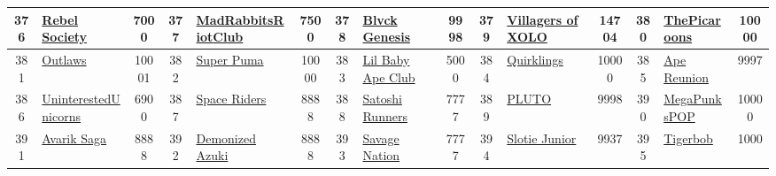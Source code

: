 \begin{table*}[]
{\begin{tabular}{|c|l|c|c|l|c|c|l|c|c|l|c|c|l|c|}
        376   & \href{https://www.rebelsociety.io/}{Rebel Society}                                 & 7000              & 377   & \href{https://madrabbits.io/}{MadRabbitsRiotClub}                                                 & 7500              & 378   & \href{https://blvck.com}{Blvck Genesis}                                           & 9998              & 379   & \href{https://planetxolo.com/}{Villagers of XOLO}                             & 14704             & 380   & \href{https://thepicaroons.com}{ThePicaroons}                                             & 10000                                   \\ \hline
        381   & \href{https://outlaws.wtf/}{Outlaws}                                               & 10001             & 382   & \href{https://blackstation.puma.com/superpuma}{Super Puma}                                        & 10000             & 383   & \href{https://www.lilbabyapeclub.com}{Lil Baby Ape Club}                          & 5000              & 384   & \href{https://quirkies.io/quirklings}{Quirklings}                             & 10000             & 385   & \href{https://www.apereunion.xyz/\#/}{Ape Reunion}                                        & 9997                                    \\ \hline
        386   & \href{https://uunicorns.io}{UninterestedUnicorns}                                  & 6900              & 387   & \href{https://spaceriders.xyz}{Space Riders}                                                      & 8888              & 388   & \href{https://opensea.io/collection/satoshirunnersofficial}{Satoshi Runners}      & 7777              & 389   & \href{https://www.plutoalliance.com/}{PLUTO}                                  & 9998              & 390   & \href{https://megapunks.com/}{MegaPunksPOP}                                               & 10000                                   \\ \hline
        391   & \href{https://avariksaga.com/}{Avarik Saga}                                        & 8888              & 392   & \href{http://dezuki.com}{Demonized Azuki}                                                         & 8888              & 393   & \href{https://savagenationnft.com}{Savage Nation}                                 & 7777              & 394   & \href{https://junior.slotie.com/}{Slotie Junior}                              & 9937              & 395   & \href{https://tigerbob.io}{Tigerbob}                                                      & 1000                                    \\ \hline

\end{tabular}}
\end{table*}
